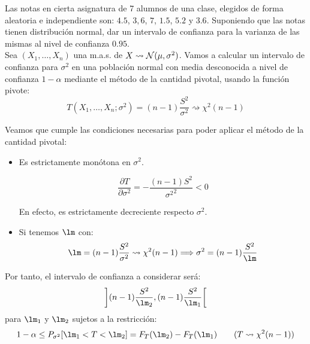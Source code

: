 \begin{ejercicio}
    Las notas en cierta asignatura de 7 alumnos de una clase, elegidos de forma aleatoria e independiente son: $4.5$, $3, 6$, $7$, $1.5$, $5.2$ y $3.6$. Suponiendo que las notas tienen distribución normal, dar un intervalo de confianza para la varianza de las mismas al nivel de confianza $0.95$.\\

    Sea $(X_1, \ldots, X_n)$ una m.a.s. de $X\rightsquigarrow\mathcal{N}(\mu, \sigma^2)$. Vamos a calcular un intervalo de confianza para $\sigma^2$ en una población normal con media desconocida a nivel de confianza $1-\alpha$ mediante el método de la cantidad pivotal, usando la función pivote:
    \begin{equation*}
        T(X_1, \ldots, X_n;\sigma^2) = (n-1)\frac{S^2}{\sigma^2} \rightsquigarrow\chi^2(n-1)
    \end{equation*}

    Veamos que cumple las condiciones necesarias para poder aplicar el método de la cantidad pivotal:
    \begin{itemize}
        \item Es estrictamente monótona en $\sigma^2$.
        
        \begin{equation*}
            \frac{\partial T}{\partial \sigma^2} = -\frac{(n-1)S^2}{{\sigma^2}^2} < 0
        \end{equation*}

        En efecto, es estrictamente decreciente respecto $\sigma^2$.
        \item Si tenemos $\lm$ con:
            \begin{equation*}
                \lm = (n-1)\frac{S^2}{\sigma^2} \rightsquigarrow\chi^2(n-1) \Longrightarrow \sigma^2 = (n-1)\frac{S^2}{\lm}
            \end{equation*}
    \end{itemize}

    Por tanto, el intervalo de confianza a considerar será:
    \begin{equation*}
        \left](n-1)\frac{S^2}{\lm_2},(n-1)\frac{S^2}{\lm_1}\right[
    \end{equation*}
    para $\lm_1$ y $\lm_2$ sujetos a la restricción:
    \begin{equation*}
        1-\alpha \leq P_{\sigma^2}[\lm_1<T<\lm_2] = F_T(\lm_2) - F_T(\lm_1) \qquad (T\rightsquigarrow\chi^2(n-1))
    \end{equation*}


\end{ejercicio}
